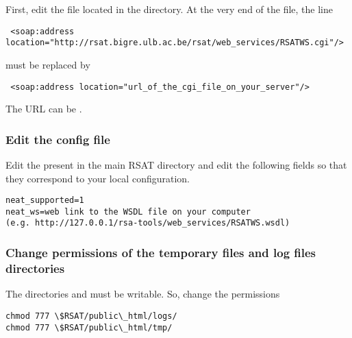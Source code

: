 \documentclass{book}
\begin{document}
First, edit the file  located in the
 directory.
At the very end of the file, the line

\begin{footnotesize}
\begin{verbatim}
 <soap:address location="http://rsat.bigre.ulb.ac.be/rsat/web_services/RSATWS.cgi"/>
\end{verbatim}
\end{footnotesize}

must be replaced by

\begin{footnotesize}
\begin{verbatim}
 <soap:address location="url_of_the_cgi_file_on_your_server"/>
\end{verbatim}
\end{footnotesize}

The URL can be .

\subsubsection{Edit the \neat config file}

Edit the  present in the main RSAT directory and edit the following fields so that they correspond to your local configuration.

\begin{footnotesize}
\begin{verbatim}
neat_supported=1
neat_ws=web link to the WSDL file on your computer
(e.g. http://127.0.0.1/rsa-tools/web_services/RSATWS.wsdl)
\end{verbatim}
\end{footnotesize}

\subsubsection{Change permissions of the temporary files and log files directories}

The directories  and  must be writable. So, change the permissions

\begin{footnotesize}
\begin{verbatim}
chmod 777 \$RSAT/public\_html/logs/
chmod 777 \$RSAT/public\_html/tmp/
\end{verbatim}
\end{footnotesize}
\end{document}
